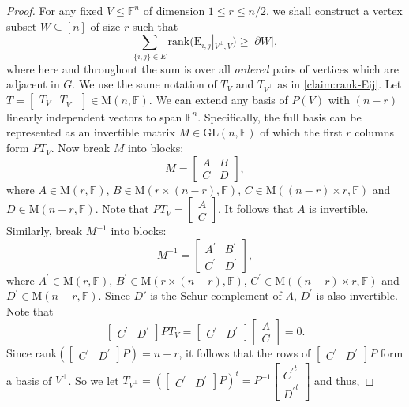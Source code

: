 \documentclass[11pt]{article}
\newcommand{\C}{{\mathbb C}}
\theoremstyle{plain}
\numberwithin{equation}{section}
\theoremstyle{definition}
\newcommand{\GL}{\mathrm{GL}}
\newcommand{\F}{\mathbb{F}}
\newcommand{\rk}{\mathrm{rank}}
\newcommand{\M}{\mathrm{M}}
\newcommand{\E}{\mathrm{E}}
\newcommand{\ann}{V^{\perp}}
\newcommand\smat[1]{\left[\begin{smallmatrix}#1\end{smallmatrix}\right]}
\begin{document}
\begin{proof}
    For any fixed $V\leq\F^n$ of dimension $1\leq r\leq n/2$, we shall construct a vertex subset $W\subseteq[n]$ of size $r$ such that 
    \[
        \sum_{\{i,j\}\in E}\rk(\E_{i,j}|_{\ann, V})\geq |\partial W|,
    \]
    where here and throughout the sum is over all \emph{ordered} pairs of vertices which are adjacent in $G$.
    We use the same notation of $T_V$ and $T_{\ann}$ as in \cref{claim:rank-Eij}. Let $T = \begin{bmatrix}T_V&T_{\ann}\end{bmatrix}\in\M(n,\F)$. 
    We can extend any basis of $P(V)$ with $(n-r)$ linearly independent vectors to span $\F^n$. Specifically, the full basis can be represented as an invertible matrix $M\in\GL(n,\F)$ of which the first $r$ columns form $PT_V$. Now break $M$ into blocks:
    $$
    M=
    \begin{bmatrix}
        A&B\\
        C&D
    \end{bmatrix},
    $$
    where $A\in\M(r,\F)$, $B\in\M(r\times(n-r),\F)$, $C\in\M((n-r)\times r,\F)$ and $D\in\M(n-r,\F)$. Note that $PT_V=\smat{A\\C}$. It follows that $A$ is invertible. Similarly, break $M^{-1}$ into blocks:
    $$
    M^{-1}=
    \begin{bmatrix}
        A^{\prime}&B^{\prime}\\
        C^{\prime}&D^{\prime}
    \end{bmatrix},
    $$
    where $A^{\prime}\in\M(r,\F)$, $B^{\prime}\in\M(r\times(n-r),\F)$, $C^{\prime}\in\M((n-r)\times r,\F)$ and $D^{\prime}\in\M(n-r,\F)$. Since $D'$ is the Schur complement of $A$,
    $D^{\prime}$ is also invertible. Note that
    $$
    \begin{bmatrix}C^{\prime}&D^{\prime}\end{bmatrix}PT_V=\begin{bmatrix}C^{\prime}&D^{\prime}\end{bmatrix}\begin{bmatrix}A\\C\end{bmatrix}=0.
    $$
    Since $\rk(\begin{bmatrix}C^{\prime}&D^{\prime}\end{bmatrix}P)=n-r$, it follows that the rows of $\begin{bmatrix}C^{\prime}&D^{\prime}\end{bmatrix}P$ form a basis of $\ann$. So we let $T_{\ann}=(\begin{bmatrix}C^{\prime}&D^{\prime}\end{bmatrix}P)^t=P^{-1}\smat{{C^{\prime}}^t\\{D^{\prime}}^t}$ and thus,

\end{proof}
\end{document}
